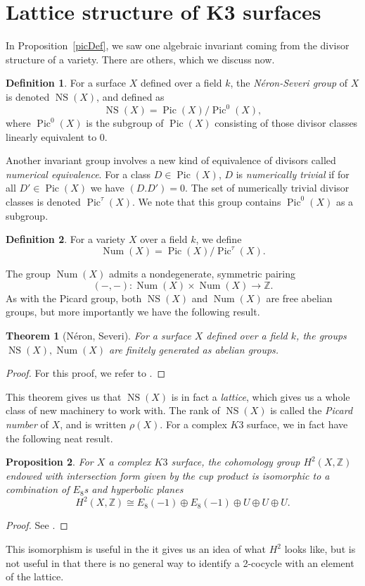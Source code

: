 \documentclass[12pt,twoside]{reedthesis}
\theoremstyle{plain}
\newtheorem{theorem}{Theorem}[chapter]
\newtheorem{proposition}[theorem]{Proposition}
\theoremstyle{definition}
\newtheorem{definition}{Definition}[section]
\theoremstyle{remark}
\newcommand{\ZZ}{\mathbb{Z}}
\newcommand{\Pic}{\operatorname{Pic}}
\newcommand{\NS}{\operatorname{NS}}
\newcommand{\Num}{\operatorname{Num}}
\begin{document}
\section{Lattice structure of K3 surfaces}
In Proposition~\ref{picDef}, we saw one algebraic invariant coming from the divisor structure of a variety. There are others, which we discuss now.
\begin{definition}
For a surface $X$ defined over a field $k$, the \emph{N\'eron-Severi group} of $X$ is denoted $\NS(X)$, and defined as \[\NS(X)=\Pic(X)/\Pic^0(X),\] where $\Pic^0(X)$ is the subgroup of $\Pic(X)$ consisting of those divisor classes linearly equivalent to 0.
\end{definition}
\noindent Another invariant group involves a new kind of equivalence of divisors called \emph{numerical equivalence}. For a class $D\in\Pic(X)$, $D$ is \emph{numerically trivial} if for all $D'\in\Pic(X)$ we have $(D.D')=0$. The set of numerically trivial divisor classes is denoted $\Pic^\tau(X)$. We note that this group contains $\Pic^0(X)$ as a subgroup.
\begin{definition}
For a variety $X$ over a field $k$, we define \[\Num(X)=\Pic(X)/\Pic^\tau(X).\]
\end{definition}
\noindent The group $\Num(X)$ admits a nondegenerate, symmetric pairing
\[
(-,-):\Num(X)\times\Num(X)\to\ZZ.
\]
As with the Picard group, both $\NS(X)$ and $\Num(X)$ are free abelian groups, but more importantly we have the following result.
\begin{theorem}[N\'eron, Severi] For a surface $X$ defined over a field $k$, the groups $\NS(X),\Num(X)$ are finitely generated as abelian groups.
\end{theorem}
\begin{proof}
For this proof, we refer to \cite[Theorem 3.25]{milneET}.
\end{proof}
\noindent This theorem gives us that $\NS(X)$ is in fact a \emph{lattice}, which gives us a whole class of new machinery to work with. The rank of $\NS(X)$ is called the \emph{Picard number} of $X$, and is written $\rho(X)$.
For a complex $K3$ surface, we in fact have the following neat result.
\begin{proposition}
For $X$ a complex $K3$ surface, the cohomology group $H^2(X,\ZZ)$ endowed with intersection form given by the cup product is isomorphic to a combination of $E_8$s and hyperbolic planes
\[
H^2(X,\ZZ)\cong E_8(-1)\oplus E_8(-1)\oplus U\oplus U\oplus U.
\]
\end{proposition}
\begin{proof}
See \cite[Proposition 1.3.5]{huybrechts}.
\end{proof}
\noindent This isomorphism is useful in the it gives us an idea of what $H^2$ looks like, but is not useful in that there is no general way to identify a 2-cocycle with an element of the lattice.
\end{document}
